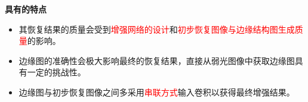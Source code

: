 \documentclass[CJK,aspectratio=169]{beamer}  %
\begin{document}
\begin{frame}
		\vspace{-0.5cm}
		
		\begin{minipage}{.9\textwidth}
			\textbf{\tiny 具有的特点}
			\begin{itemize} \tiny
				\item [\checkmark] 其恢复结果的质量会受到\textcolor{red}{增强网络的设计}和\textcolor{red}{初步恢复图像与边缘结构图生成质量}的影响。
				
				\item [\checkmark] 边缘图的准确性会极大影响最终的恢复结果，直接从弱光图像中获取边缘图具有一定的挑战性。
				
				\item [\checkmark] 边缘图与初步恢复图像之间多采用\textcolor{red}{串联方式}输入卷积以获得最终增强结果。
			\end{itemize}
		\end{minipage}
		
	\end{frame}	
	
\end{document}
